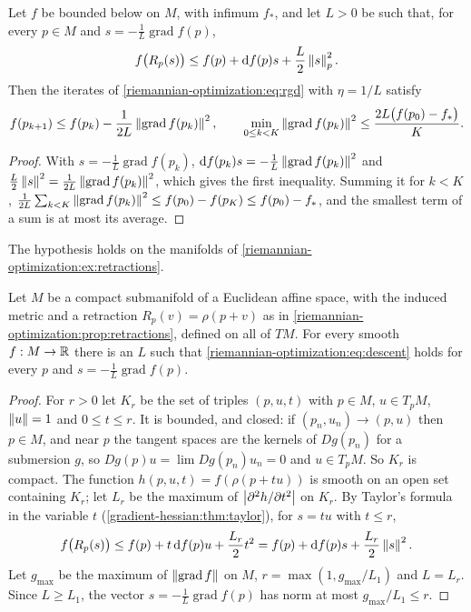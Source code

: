 \begin{notechapter}
\begin{theorem}
\label{riemannian-optimization:thm:rgd}
Let $f$ be bounded below on $M$, with infimum $f_*$, and let $L > 0$ be
such that, for every $p\in M$ and $s = -\frac1L\operatorname{grad}f(p)$,
\begin{equation}\label{riemannian-optimization:eq:descent}
  f\bigl(R_p(s)\bigr)\leq f(p) + \mathrm{d} f(p)s + \frac L2\left\|s\right\|_p^2 .
\end{equation}
Then the iterates of \eqref{riemannian-optimization:eq:rgd} with
$\eta = 1/L$ satisfy
\[
  f(p_{k+1})\leq f(p_k) - \frac1{2L}\left\|\operatorname{grad}f(p_k)\right\|^2 ,
  \qquad
  \min_{0\leq k < K}\left\|\operatorname{grad}f(p_k)\right\|^2
  \leq\frac{2L\bigl(f(p_0) - f_*\bigr)}K .
\]
\end{theorem}

\begin{proof}
With $s = -\frac1L\operatorname{grad}f(p_k)$,
$\mathrm{d} f(p_k)s = -\frac1L\left\|\operatorname{grad}f(p_k)\right\|^2$ and
$\frac L2\left\|s\right\|^2 = \frac1{2L}\left\|\operatorname{grad}f(p_k)\right\|^2$, which
gives the first inequality. Summing it for $k < K$,
$\frac1{2L}\sum_{k<K}\left\|\operatorname{grad}f(p_k)\right\|^2
\leq f(p_0) - f(p_K)\leq f(p_0) - f_*$, and the smallest term of a sum is
at most its average.
\end{proof}

The hypothesis holds on the manifolds of
\cref{riemannian-optimization:ex:retractions}.

\begin{proposition}
\label{riemannian-optimization:prop:compact}
Let $M$ be a compact submanifold of a Euclidean affine space, with the
induced metric and a retraction $R_p(v) = \rho(p + v)$ as in
\cref{riemannian-optimization:prop:retractions}, defined on all of $TM$.
For every smooth $f:M\to\mathbb{R}$ there is an $L$ such that
\eqref{riemannian-optimization:eq:descent} holds for every $p$ and
$s = -\frac1L\operatorname{grad}f(p)$.
\end{proposition}

\begin{proof}
For $r > 0$ let $K_r$ be the set of triples $(p, u, t)$ with $p\in M$,
$u\in T_pM$, $\left\|u\right\| = 1$ and $0\leq t\leq r$. It is bounded, and
closed: if $(p_n, u_n)\to(p, u)$ then $p\in M$, and near $p$ the tangent
spaces are the kernels of $Dg(p_n)$ for a submersion $g$, so
$Dg(p)u = \lim Dg(p_n)u_n = 0$ and $u\in T_pM$. So $K_r$ is compact. The
function $h(p, u, t) = f(\rho(p + tu))$ is smooth on an open set
containing $K_r$; let $L_r$ be the maximum of
$\left|\partial^2h/\partial t^2\right|$ on $K_r$. By Taylor's formula in the
variable $t$
(\cref{gradient-hessian:thm:taylor}), for $s = tu$ with $t\leq r$,
\[
  f\bigl(R_p(s)\bigr)\leq f(p) + t\,\mathrm{d} f(p)u + \frac{L_r}2t^2
  = f(p) + \mathrm{d} f(p)s + \frac{L_r}2\left\|s\right\|^2 .
\]
Let $g_{\max}$ be the maximum of $\left\|\operatorname{grad}f\right\|$ on $M$,
$r = \max(1, g_{\max}/L_1)$ and $L = L_r$. Since $L\geq L_1$, the vector
$s = -\frac1L\operatorname{grad}f(p)$ has norm at most
$g_{\max}/L_1\leq r$.
\end{proof}


\end{notechapter}
